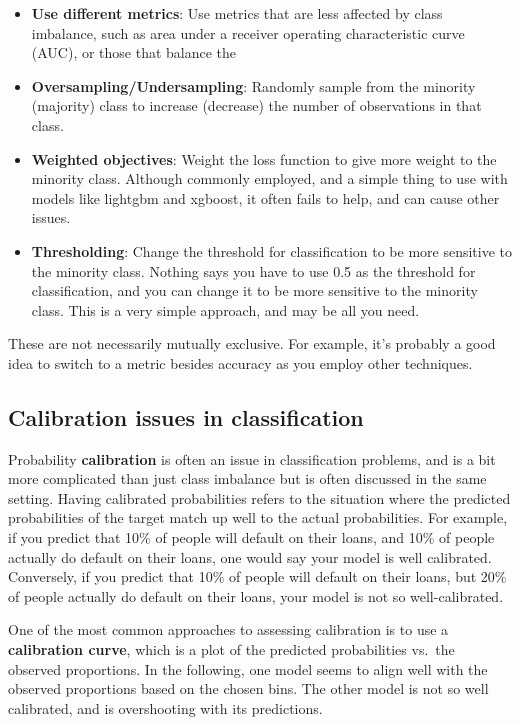 \documentclass[
  letterpaper,
]{krantz}
\providecommand{\tightlist}{%
  \setlength{\itemsep}{0pt}\setlength{\parskip}{0pt}}\usepackage{longtable,booktabs,array}
\begin{document}
\begin{itemize}
\tightlist
\item
  \textbf{Use different metrics}: Use metrics that are less affected by
  class imbalance, such as area under a receiver operating
  characteristic curve (AUC), or those that balance the
\item
  \textbf{Oversampling/Undersampling}: Randomly sample from the minority
  (majority) class to increase (decrease) the number of observations in
  that class.
\item
  \textbf{Weighted objectives}: Weight the loss function to give more
  weight to the minority class. Although commonly employed, and a simple
  thing to use with models like lightgbm and xgboost, it often fails to
  help, and can cause other issues.
\item
  \textbf{Thresholding}: Change the threshold for classification to be
  more sensitive to the minority class. Nothing says you have to use 0.5
  as the threshold for classification, and you can change it to be more
  sensitive to the minority class. This is a very simple approach, and
  may be all you need.
\end{itemize}

These are not necessarily mutually exclusive. For example, it's probably
a good idea to switch to a metric besides accuracy as you employ other
techniques.

\subsection{Calibration issues in
classification}\label{calibration-issues-in-classification}

Probability \textbf{calibration} is often an issue in classification
problems, and is a bit more complicated than just class imbalance but is
often discussed in the same setting. Having calibrated probabilities
refers to the situation where the predicted probabilities of the target
match up well to the actual probabilities. For example, if you predict
that 10\% of people will default on their loans, and 10\% of people
actually do default on their loans, one would say your model is well
calibrated. Conversely, if you predict that 10\% of people will default
on their loans, but 20\% of people actually do default on their loans,
your model is not so well-calibrated.

One of the most common approaches to assessing calibration is to use a
\textbf{calibration curve}, which is a plot of the predicted
probabilities vs.~the observed proportions. In the following, one model
seems to align well with the observed proportions based on the chosen
bins. The other model is not so well calibrated, and is overshooting
with its predictions.
\end{document}
